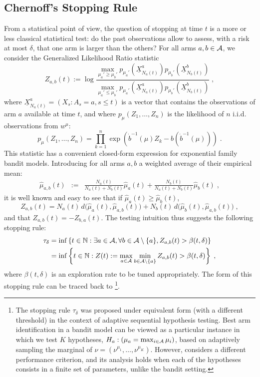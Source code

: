 \documentclass{colt2016} %
\begin{document}
\subsection{Chernoff's Stopping Rule}\label{subsec:Stopping}
From a statistical point of view, the question of stopping at time $t$ is a more or less classical statistical test: do the past observations allow to assess, with a risk at most $\delta$, that one arm is larger than the others?
For all arms $a,b\in \mathcal{A}$, we consider the Generalized Likelihood Ratio statistic
\[Z_{a,b}(t) := \log\frac{\max_{\mu_a'\geq \mu_b'} p_{\mu_a'}\left(\underline{X}^a_{N_a(t)}\right)p_{\mu_b'}\left(\underline{X}^b_{N_b(t)}\right)}{\max_{\mu_a'\leq \mu_b'} p_{\mu_a'}\left(\underline{X}^a_{N_a(t)}\right)p_{\mu_b'}\left(\underline{X}^b_{N_b(t)}\right)}\;,\]
where $\underline{X}^a_{N_a(t)} = (X_s: A_s=a, s\leq t)$ is a vector that contains the observations of arm $a$ available at time $t$, and where $p_{\mu}(Z_1,\dots,Z_n)$ is the likelihood of $n$ i.i.d. observations from $w^{\mu}$: 
\[p_{\mu}(Z_1,\dots,Z_n) = \prod_{k=1}^{n} \exp(\dot{b}^{-1}(\mu) Z_k - b(\dot{b}^{-1}(\mu)))\;.\]
This statistic has a convenient closed-form expression for exponential family bandit models. Introducing for all arms $a,b$ a weighted average of their empirical mean: 
 \begin{eqnarray*}
\hat{\mu}_{a,b}(t) &:=& \frac{N_a(t)}{N_a(t) + N_b(t)}\hat{\mu}_a(t) + \frac{N_b(t)}{N_a(t) + N_b(t)}{\hat{\mu}_b(t)}\;,
\end{eqnarray*}
it is well known and easy to see that if $\hat{\mu}_a(t) \geq \hat{\mu}_b(t)$, 
	\begin{equation}Z_{a,b}(t) = N_a(t)\, d\big(\hat{\mu}_a(t), \hat{\mu}_{a,b}(t) \big) + N_b(t)\, d\big(\hat{\mu}_b(t), \hat{\mu}_{a,b}(t) \big)\;,\label{eq:Zformula}\end{equation}
and that $Z_{a,b}(t) = - Z_{b,a}(t)$.
The testing intuition thus suggests the following stopping rule: 
\begin{align}\tau_\delta &= \inf \left\{t \in \mathbb{N} : \exists a\in \mathcal{A}, \forall b \in \mathcal{A} \setminus \{a\}, Z_{a,b}(t)>\beta(t,\delta)\right\} \nonumber\\
&= \inf \left\{t \in \mathbb{N} : Z(t):= \max_{a\in \mathcal{A}} \min_{b \in \mathcal{A} \setminus \{a\}} Z_{a,b}(t)>\beta(t,\delta)\right\}\;,\label{def:Stopping}\end{align}
where $\beta(t,\delta)$ is an exploration rate to be tuned appropriately. The form of this stopping rule can be traced back to \cite{Chernoff59}\footnote{The stopping rule $\tau_\delta$ was proposed under equivalent form (with a different threshold) in the context of adaptive sequential hypothesis testing. Best arm identification in a bandit model can be viewed as a particular instance in which we test $K$ hypotheses, $H_a : ( \mu_a = \max_{i \in \mathcal{A}} \mu_i)$, based on adaptively sampling the marginal of $\nu = (\nu^{\mu_1},\dots,\nu^{\mu_K})$. However, \cite{Chernoff59} considers a different performance criterion, and its analysis holds when each of the hypotheses consists in a finite set of parameters, unlike the bandit setting.}.
\end{document}
